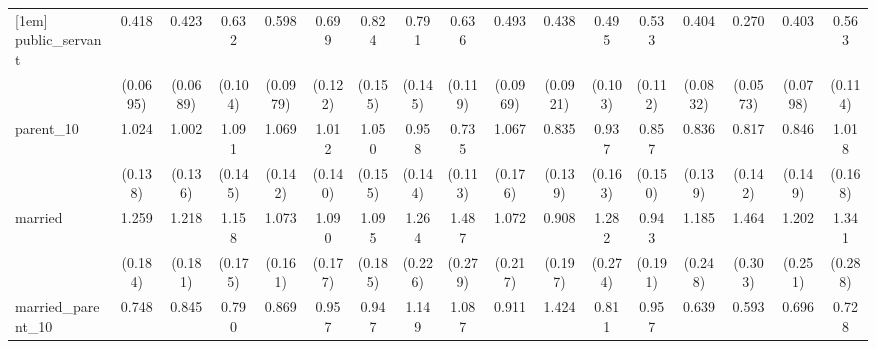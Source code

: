 {\begin{tabular}{l*{16}{c}}
[1em]
public\_servant      &       0.418\sym{***}&       0.423\sym{***}&       0.632\sym{**} &       0.598\sym{**} &       0.699\sym{*}  &       0.824         &       0.791         &       0.636\sym{*}  &       0.493\sym{***}&       0.438\sym{***}&       0.495\sym{***}&       0.533\sym{**} &       0.404\sym{***}&       0.270\sym{***}&       0.403\sym{***}&       0.563\sym{**} \\
                    &    (0.0695)         &    (0.0689)         &     (0.104)         &    (0.0979)         &     (0.122)         &     (0.155)         &     (0.145)         &     (0.119)         &    (0.0969)         &    (0.0921)         &     (0.103)         &     (0.112)         &    (0.0832)         &    (0.0573)         &    (0.0798)         &     (0.114)         \\
[1em]
parent\_10           &       1.024         &       1.002         &       1.091         &       1.069         &       1.012         &       1.050         &       0.958         &       0.735\sym{*}  &       1.067         &       0.835         &       0.937         &       0.857         &       0.836         &       0.817         &       0.846         &       1.018         \\
                    &     (0.138)         &     (0.136)         &     (0.145)         &     (0.142)         &     (0.140)         &     (0.155)         &     (0.144)         &     (0.113)         &     (0.176)         &     (0.139)         &     (0.163)         &     (0.150)         &     (0.139)         &     (0.142)         &     (0.149)         &     (0.168)         \\
[1em]
married             &       1.259         &       1.218         &       1.158         &       1.073         &       1.090         &       1.095         &       1.264         &       1.487\sym{*}  &       1.072         &       0.908         &       1.282         &       0.943         &       1.185         &       1.464         &       1.202         &       1.341         \\
                    &     (0.184)         &     (0.181)         &     (0.175)         &     (0.161)         &     (0.177)         &     (0.185)         &     (0.226)         &     (0.279)         &     (0.217)         &     (0.197)         &     (0.274)         &     (0.191)         &     (0.248)         &     (0.303)         &     (0.251)         &     (0.288)         \\
[1em]
married\_parent\_10   &       0.748         &       0.845         &       0.790         &       0.869         &       0.957         &       0.947         &       1.149         &       1.087         &       0.911         &       1.424         &       0.811         &       0.957         &       0.639         &       0.593         &       0.696         &       0.728         \\

\end{tabular}}
